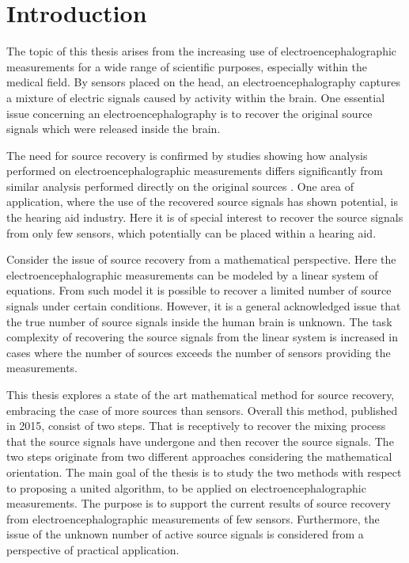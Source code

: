 \chapter*{Introduction}\label{ch:introduction}
The topic of this thesis arises from the increasing use of electroencephalographic measurements for a wide range of scientific purposes, especially within the medical field. 
By sensors placed on the head, an electroencephalography captures a mixture of electric signals caused by activity within the brain. 
One essential issue concerning an electroencephalography is to recover the original source signals which were released inside the brain. 

The need for source recovery is confirmed by studies showing how analysis performed on electroencephalographic measurements differs significantly from similar analysis performed directly on the original sources \cite{Friston2002}.
One area of application, where the use of the recovered source signals has shown potential, is the hearing aid industry. Here it is of special interest to recover the source signals from only few sensors, which potentially can be placed within a hearing aid. 

Consider the issue of source recovery from a mathematical perspective. Here the electroencephalographic measurements can be modeled by a linear system of equations. From such model it is possible to recover a limited number of source signals under certain conditions. However, it is a general acknowledged issue that the true number of source signals inside the human brain is unknown.
The task complexity of recovering the source signals from the linear system is increased in cases where the number of sources exceeds the number of sensors providing the measurements.

This thesis explores a state of the art mathematical method for source recovery, embracing the case of more sources than sensors. 
Overall this method, published in 2015, consist of two steps. That is receptively to recover the mixing process that the source signals have undergone and then recover the source signals.
The two steps originate from two different approaches considering the mathematical orientation. 
The main goal of the thesis is to study the two methods with respect to proposing a united algorithm, to be applied on electroencephalographic measurements. The purpose is to support the current results of source recovery from electroencephalographic measurements of few sensors. Furthermore, the issue of the unknown number of active source signals is considered from a perspective of practical application. 

